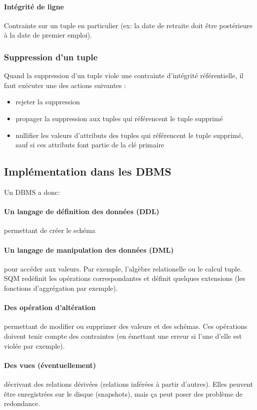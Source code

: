 \documentclass[a4paper]{article}
\begin{document}
\paragraph{Intégrité de ligne}
Contrainte sur un tuple en particulier (ex: la date de retraite doit être postérieure
à la date de premier emploi).

\subsubsection{Suppression d'un tuple}
Quand la suppression d'un tuple viole une contrainte d'intégrité référentielle,
il faut exécuter une des actions suivantes :
\begin{itemize}
  \item rejeter la suppression
  \item propager la suppression aux tuples qui référencent le tuple supprimé
  \item nullifier les valeurs d'attributs des tuples qui référencent le tuple supprimé,
  sauf si ces attributs font partie de la clé primaire
\end{itemize}

\subsection{Implémentation dans les DBMS}
Un DBMS a donc:
\paragraph{Un langage de définition des données (DDL)} permettant de créer le schéma
\paragraph{Un langage de manipulation des données (DML)} pour accéder aux valeurs.
Par exemple, l'algèbre relationelle ou le calcul tuple. SQM redéfinit les opérations
correspondantes et définit quelques extensions (les fonctions d'aggrégation par exemple).
\paragraph{Des opération d'altération} permettant de modifier ou supprimer des valeurs et des schémas.
Ces opérations doivent tenir compte des contraintes (en émettant une erreur si l'une d'elle est violée par exemple).
\paragraph{Des vues (éventuellement)} décrivant des relations dérivées
(relations inférées à partir d'autres). Elles peuvent être enregistrées sur le
disque (snapshots), mais ça peut poser des problème de redondance.
\end{document}
